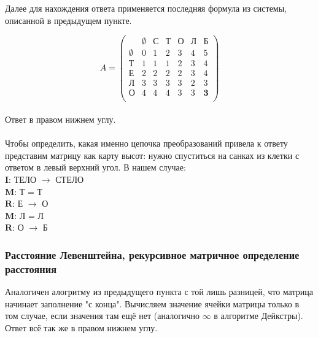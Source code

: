 \documentclass[12pt,a4paper]{article}
\begin{document}
Далее для нахождения ответа применяется последняя формула из системы, описанной в предыдущем пункте.

\begin{equation*}
A = \left(
\begin{array}{ccccccc}
& \emptyset & \text{С} & \text{Т} & \text{О} & \text{Л} & \text{Б}\\
\emptyset & 0 & 1 & 2 & 3 & 4 & 5\\
\text{Т} & 1 & 1 & 1 & 2 & 3 & 4 \\ 
\text{Е} & 2 & 2 & 2 & 2 & 3 & 4 \\
\text{Л} & 3 & 3 & 3 & 3 & 2 & 3 \\
\text{О} & 4 & 4 & 4 & 3 & 3 & \textbf{3} \\
\end{array}
\right)
\end{equation*}
\\
Ответ в правом нижнем углу.\\
\\
Чтобы определить, какая именно цепочка преобразований привела к ответу представим матрицу как карту высот: нужно спуститься на санках из клетки с ответом в левый верхний угол. В нашем случае:\\
$\textbf{I}$: ТЕЛО $\rightarrow$ СТЕЛО\\
$\textbf{M}$: Т = Т\\
$\textbf{R}$: Е $\rightarrow$ О\\
$\textbf{M}$: Л = Л\\
$\textbf{R}$: О $\rightarrow$ Б\\


\subsubsection{Расстояние Левенштейна, рекурсивное матричное определение расстояния}
Аналогичен алогритму из предыдущего пункта с той лишь разницей, что матрица начинает заполнение "с конца". Вычисляем значение ячейки матрицы только в том случае, если значения там ещё нет (аналогично $\infty$ в алгоритме Дейкстры). Ответ всё так же в правом нижнем углу.
\end{document}
